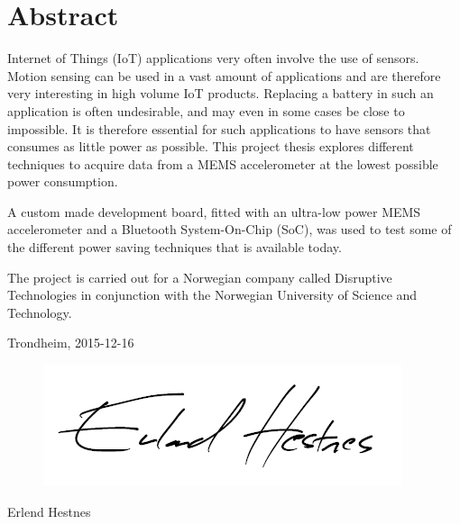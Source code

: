 \section*{Abstract}

Internet of Things (IoT) applications very often involve the use of sensors. Motion sensing can be used in a vast amount of applications and are therefore very interesting in high volume IoT products. Replacing a battery in such an application is often undesirable, and may even in some cases be close to impossible. It is therefore essential for such applications to have sensors that consumes as little power as possible. This project thesis explores different techniques to acquire data from a MEMS accelerometer at the lowest possible power consumption.

A custom made development board, fitted with an ultra-low power MEMS accelerometer and a Bluetooth System-On-Chip (SoC), was used to test some of the different power saving techniques that is available today. 

The project is carried out for a Norwegian company called Disruptive Technologies in conjunction with the Norwegian University of Science and Technology.

\begin{center}
Trondheim, 2015-12-16\\[1pc]
\begin{figure}[h]
\centering
\includegraphics[scale=0.5]{fig/underskrift.png}
\label{fig:underskrift}
\end{figure}
Erlend Hestnes
\end{center}